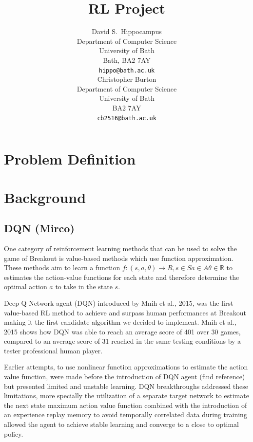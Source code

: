 \documentclass{article}
\title{RL Project}
\author{
  David S.~Hippocampus
  \\
  Department of Computer Science\\
  University of Bath\\
  Bath, BA2 7AY \\
  \texttt{hippo@bath.ac.uk} \\
\And
 Christopher Burton
 \\
 Department of Computer Science\\
 University of Bath \\
 BA2 7AY\\
 \texttt{cb2516@bath.ac.uk} \\
}
\begin{document}
\maketitle

\section{Problem Definition}


\section{Background}


\subsection{DQN (Mirco)}
One category of reinforcement learning methods that can be used to solve the game of Breakout is value-based methods which use function approximation.
These methods aim to learn a function $f: (s,a,\theta) \rightarrow R, s \in S  a \in A \theta \in \mathbb{R}$ to estimates the action-value functions for each state and therefore determine the optimal action $a$ to take in the state $s$.

Deep Q-Network agent (DQN) introduced by Mnih et al., 2015, was the first value-based RL method to achieve and surpass human performances at Breakout making it the first candidate algorithm we decided to implement.
Mnih et al., 2015 shows how DQN was able to reach an average score of 401 over 30 games, compared to an average score of 31 reached in the same testing conditions by a tester professional human player.

Earlier attempts, to use nonlinear function approximations to estimate the action value function, were made before the introduction of DQN agent (find reference) but presented limited and unstable learning.
DQN breakthroughs addressed these limitations, more specially the utilization of a separate target network to estimate the next state maximum action value function combined with the introduction of an experience replay memory to avoid temporally correlated data during training allowed the agent to achieve stable learning and converge to a close to optimal policy.
\end{document}
